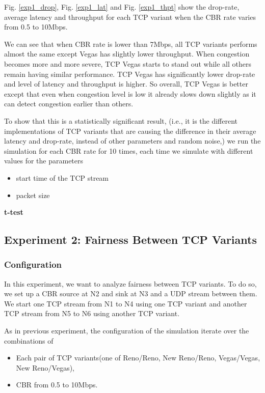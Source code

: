 \documentclass[10pt, conference]{IEEEtran/IEEEtran}
\begin{document}
Fig. \ref{exp1_drop}, Fig. \ref{exp1_lat} and Fig. \ref{exp1_thpt} show the drop-rate, average latency and throughput for each TCP variant when the CBR rate varies from 0.5 to 10Mbps. 

We can see that when CBR rate is lower than 7Mbps, all TCP variants performs almost the same except Vegas has slightly lower throughput. When congestion becomes more and more severe, TCP Vegas starts to stand out while all others remain having similar performance. TCP Vegas has significantly lower drop-rate and level of latency and throughput is higher. So overall, TCP Vegas is better except that even when congestion level is low it already slows down slightly as it can detect congestion earlier than others\cite{vegas}.

To show that this is a statistically significant result, (i.e., it is the different implementations of TCP variants that are causing the difference in their average latency and drop-rate, instead of other parameters and random noise,) we run the simulation for each CBR rate for 10 times, each time we simulate with different values for the parameters

\begin{itemize}
\item start time of the TCP stream
\item packet size
\end{itemize}

\textbf{t-test}


\subsection{Experiment 2: Fairness Between TCP Variants}
\subsubsection{Configuration}

In this experiment, we want to analyze fairness between TCP variants. To do so, we set up a CBR source at N2 and sink at N3 and a UDP stream between them. We start one TCP stream from N1 to N4 using one TCP
variant and another TCP stream from N5 to N6 using another TCP variant.

As in previous experiment, the configuration of the simulation iterate over the combinations of 
\begin{itemize}
\item Each pair of TCP variants(one of Reno/Reno, New Reno/Reno, Vegas/Vegas,
New Reno/Vegas), 
\item CBR from 0.5 to 10Mbps.
\end{itemize}
\end{document}
